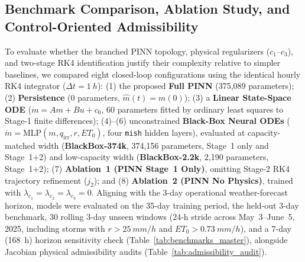 \documentclass[pdflatex,sn-nature]{sn-jnl}%
\theoremstyle{thmstyleone}%
\theoremstyle{thmstyletwo}%
\theoremstyle{thmstylethree}%
\begin{document}
\subsection{Benchmark Comparison, Ablation Study, and Control-Oriented Admissibility}\label{sec:benchmarks}

To evaluate whether the branched PINN topology, physical regularizers ($c_1$--$c_3$), and two-stage RK4 identification justify their complexity relative to simpler baselines, we compared eight closed-loop configurations using the identical hourly RK4 integrator ($\Delta t = \SI{1}{h}$): (1) the proposed \textbf{Full PINN} (375,089 parameters); (2) \textbf{Persistence} ($0$ parameters, $\hat{m}(t) = m(0)$); (3) a \textbf{Linear State-Space ODE} ($\dot{m} = Am + Bu + c_0$, 60 parameters fitted by ordinary least squares to Stage-1 finite differences); (4)--(6) unconstrained \textbf{Black-Box Neural ODEs} ($\dot{m} = \mathrm{MLP}(m, q_{\mathrm{irr}}, r, ET_0)$, four \texttt{mish} hidden layers), evaluated at capacity-matched width (\textbf{BlackBox-374k}, 374,156 parameters, Stage~1 only and Stage~1+2) and low-capacity width (\textbf{BlackBox-2.2k}, 2,190 parameters, Stage~1+2); (7) \textbf{Ablation~1 (PINN Stage~1 Only)}, omitting Stage-2 RK4 trajectory refinement ($j_2$); and (8) \textbf{Ablation~2 (PINN No Physics)}, trained with $\lambda_{c_1} = \lambda_{c_2} = \lambda_{c_3} = 0$. Aligning with the 3-day operational weather-forecast horizon, models were evaluated on the 35-day training period, the held-out 3-day benchmark, 30 rolling 3-day unseen windows (24-h stride across May~3--June~5, 2025, including storms with $r > \SI{25}{mm/h}$ and $ET_0 > \SI{0.73}{mm/h}$), and a 7-day (168~h) horizon sensitivity check (Table~\ref{tab:benchmarks_master}), alongside Jacobian physical admissibility audits (Table~\ref{tab:admissibility_audit}).
\end{document}

